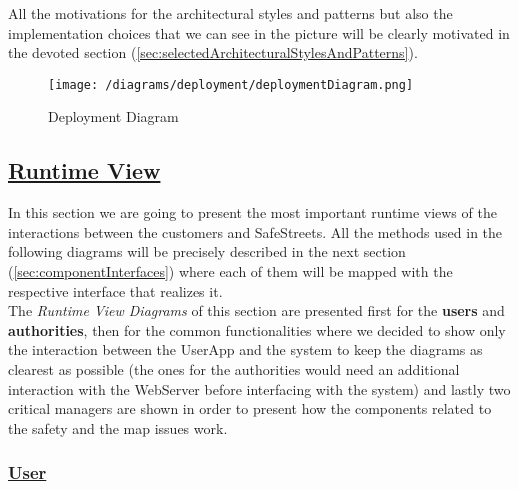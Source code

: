 			All the motivations for the architectural styles and patterns but also the implementation choices that we can see in the picture will be clearly motivated in the devoted section (\ref{sec:selectedArchitecturalStylesAndPatterns}). 
						
			\begin{figure}[hbtp]
				\centering
				\texttt{[image: /diagrams/deployment/deploymentDiagram.png]}
				\caption{\label{fig:deploymentDiagram} Deployment Diagram}
			\end{figure}
		
			\FloatBarrier
			
	\subsection[Runtime View]{\hyperlink{toc}{Runtime View}}
		\label{sec:runtimeView}
		
		In this section we are going to present the most important runtime views of the interactions between the customers and SafeStreets. All the methods used in the following diagrams will be precisely described in the next section (\ref{sec:componentInterfaces}) where each of them will be mapped with the respective interface that realizes it.\\
		
		The \emph{Runtime View Diagrams} of this section are presented first for the \textbf{users} and \textbf{authorities}, then for the common functionalities where we decided to show only the interaction between the UserApp and the system to keep the diagrams as clearest as possible (the ones for the authorities would need an additional interaction with the WebServer before interfacing with the system) and lastly two critical managers are shown in order to present how the components related to the safety and the map issues work.
		
		\subsubsection[User]{\hyperlink{toc}{User}}
			\label{sec:userRuntimeView}
			

